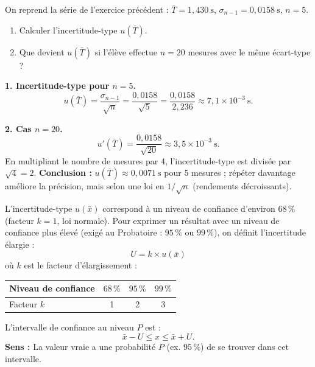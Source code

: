\documentclass[11pt]{article}
\newcommand{\cle}[1]{{\popxbold\color{popdark}#1}}
\begin{document}
\begin{exoresolu}
On reprend la série de l'exercice précédent : $\bar{T} = 1,430\ \text{s}$, $\sigma_{n-1} = 0,0158\ \text{s}$, $n = 5$.
\begin{enumerate}
\item Calculer l'incertitude-type $u(\bar{T})$.
\item Que devient $u(\bar{T})$ si l'élève effectue $n = 20$ mesures avec le même écart-type ?
\end{enumerate}
\tcblower
\textbf{1. Incertitude-type pour $n=5$.}
\[ u(\bar{T}) = \frac{\sigma_{n-1}}{\sqrt{n}} = \frac{0,0158}{\sqrt{5}} = \frac{0,0158}{2,236} \approx 7,1\times 10^{-3}\ \text{s}. \]

\textbf{2. Cas $n = 20$.}
\[ u'(\bar{T}) = \frac{0,0158}{\sqrt{20}} \approx 3,5\times 10^{-3}\ \text{s}. \]
En multipliant le nombre de mesures par 4, l'incertitude-type est divisée par $\sqrt{4} = 2$.
\textbf{Conclusion :} $u(\bar{T}) \approx 0,0071\ \text{s}$ pour 5 mesures ; répéter davantage améliore la précision, mais selon une loi en $1/\sqrt{n}$ (rendements décroissants).
\end{exoresolu}

\begin{propriete}
L'incertitude-type $u(\bar{x})$ correspond à un niveau de confiance d'environ $68\,\%$ (facteur $k=1$, loi normale). Pour exprimer un résultat avec un niveau de confiance plus élevé (exigé au Probatoire : $95\,\%$ ou $99\,\%$), on définit l'\cle{incertitude élargie} :
\[ U = k \times u(\bar{x}) \]
où $k$ est le \cle{facteur d'élargissement} :
\begin{center}
\begin{tabular}{|l|ccc|}\hline
Niveau de confiance & $68\,\%$ & $95\,\%$ & $99\,\%$ \\ \hline
Facteur $k$ & 1 & 2 & 3 \\ \hline
\end{tabular}
\end{center}
L'\cle{intervalle de confiance} au niveau $P$ est :
\[ \bar{x} - U \leq x \leq \bar{x} + U. \]
\textbf{Sens :} La valeur vraie a une probabilité $P$ (ex. $95\,\%$) de se trouver dans cet intervalle.
\end{propriete}
\end{document}
